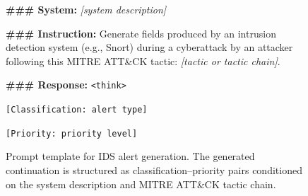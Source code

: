 \documentclass[sigconf]{acmart}
\begin{document}
\begin{figure}[t]
\centering
\begin{tcolorbox}[
  title=IDS Alert Generation Prompt Template,
  colback=Orange!8,
  colframe=Orange!70,
  boxrule=0.5pt,
  arc=2pt,
  left=5pt,
  right=5pt,
  top=5pt,
  bottom=5pt]
\footnotesize
\textbf{\#\#\# System:} \emph{[system description]}

\textbf{\#\#\# Instruction:}
Generate fields produced by an intrusion detection system (e.g., Snort)
during a cyberattack by an attacker following this MITRE ATT\&CK tactic:
\emph{[tactic or tactic chain]}.

\textbf{\#\#\# Response:}
\texttt{<think>}

\texttt{[Classification: alert type]}

\texttt{[Priority: priority level]}
\end{tcolorbox}
\caption{Prompt template for IDS alert generation. The generated continuation
is structured as classification--priority pairs conditioned on the system
description and MITRE ATT\&CK tactic chain.}
\label{fig:alert-prompt}
\end{figure}
\end{document}
